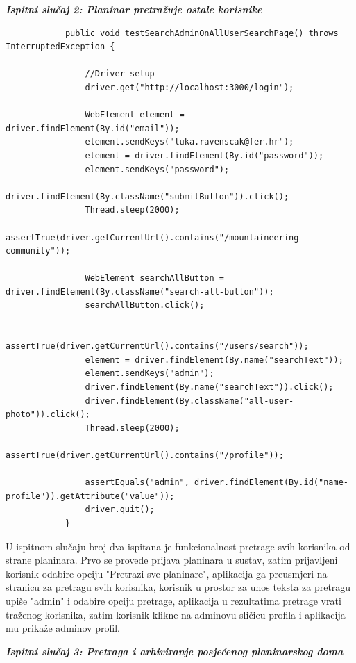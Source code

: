 	 		\textbf{\textit{Ispitni slučaj 2: Planinar pretražuje ostale korisnike}}
	 	
	 	\begin{lstlisting}
	 		public void testSearchAdminOnAllUserSearchPage() throws InterruptedException {
	 			
	 			//Driver setup
	 			driver.get("http://localhost:3000/login");
	 			
	 			WebElement element = driver.findElement(By.id("email"));        
	 			element.sendKeys("luka.ravenscak@fer.hr");
	 			element = driver.findElement(By.id("password"));
	 			element.sendKeys("password");
	 			driver.findElement(By.className("submitButton")).click();
	 			Thread.sleep(2000);
	 			assertTrue(driver.getCurrentUrl().contains("/mountaineering-community"));
	 			
	 			WebElement searchAllButton = driver.findElement(By.className("search-all-button"));
	 			searchAllButton.click(); 
	 			
	 			assertTrue(driver.getCurrentUrl().contains("/users/search"));    
	 			element = driver.findElement(By.name("searchText"));        
	 			element.sendKeys("admin");
	 			driver.findElement(By.name("searchText")).click();
	 			driver.findElement(By.className("all-user-photo")).click();
	 			Thread.sleep(2000);	    
	 			assertTrue(driver.getCurrentUrl().contains("/profile"));
	 			
	 			assertEquals("admin", driver.findElement(By.id("name-profile")).getAttribute("value"));
	 			driver.quit();
	 		}
	 	\end{lstlisting}
 	
	 	U ispitnom slučaju broj dva ispitana je funkcionalnost pretrage svih korisnika od strane planinara. Prvo se provede prijava planinara u sustav, zatim prijavljeni korisnik odabire opciju "Pretrazi sve planinare", aplikacija ga preusmjeri na stranicu za pretragu svih korisnika, korisnik u prostor za unos teksta za pretragu upiše "admin" i odabire opciju pretrage, aplikacija u rezultatima pretrage vrati traženog korisnika, zatim korisnik klikne na adminovu sličicu profila i aplikacija mu prikaže adminov profil.\newline
	 	
 		\textbf{\textit{Ispitni slučaj 3: Pretraga i arhiviranje posjećenog planinarskog doma}}
 		
